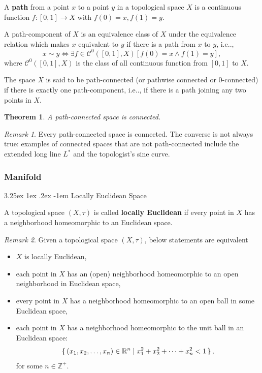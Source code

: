 \documentclass[12pt, letterpaper]{article}
\makeatletter
\newcommand{\inte}{\mathbb{Z}}
\newcommand{\re}{\mathbb{R}}
\newcommand\ie{i.e\@ifnextchar.{}{.\@}}
\newtheorem{thm}[prop]{Theorem}
\renewcommand\paragraph{\@startsection{paragraph}{4}{\z@}%
	{3.25ex \@plus1ex \@minus.2ex}%
	{-1em}%
	{\normalfont\normalsize\bfseries}}
\theoremstyle{definition}
\theoremstyle{remark}
\newtheorem*{rem*}{Remark}
\theoremstyle{definition}
\theoremstyle{plain}
\numberwithin{equation}{section}
\makeatother
\begin{document}
	\begin{def*}[path]
		A \textbf{path} from a point $x$ to a point $y$ in a topological space $X$ is a continuous function $f\colon [0,1] \to X$ with $f(0) = x, f(1) = y$.
	\end{def*}
	\begin{def*}
		A path-component of $X$ is an equivalence class of $X$ under the equivalence relation
		which makes $x$ equivalent to $y$ if there is a path from $x$ to $y$, \ie,
		\[ x\sim y \iff \exists f\in \mathcal{C}^0([0,1], X) [ f(0)=x \land  f(1)=y ] ,\]
		where $\mathcal{C}^0([0,1], X)$ is the class of all continuous function from $[0,1]$ to $X$.
	\end{def*}
	\begin{def*}
		The space $X$ is said to be path-connected (or pathwise connected or 0-connected)
		if there is exactly one path-component, \ie, if there is a path joining any two points in $X$.
	\end{def*}
	\begin{thm}
		A path-connected space is connected.
	\end{thm}
	\begin{rem*}
		Every path-connected space is connected. The converse is not always true: examples of connected spaces that are not path-connected include the extended long line $L^*$ and the topologist's sine curve.
	\end{rem*}
	
	\subsubsection{Manifold}
	\paragraph{Locally Euclidean Space}
	\begin{def*}
		A topological space $(X,\tau)$ is called \textbf{locally Euclidean}
		if every point in $X$ has a neighborhood homeomorphic to an Euclidean space.
	\end{def*}
	\begin{rem*}
		Given a topological space $(X,\tau)$, below statements are equivalent
		\begin{itemize}
			\item $X$ is locally Euclidean,
			\item each point in $X$ has an (open) neighborhood homeomorphic to an open neighborhood in Euclidean space,
			\item every point in $X$ has a neighborhood homeomorphic to an open ball in some Euclidean space,
			\item each point in $X$ has a neighborhood homeomorphic to the unit ball in an Euclidean space:
			\[ \set{(x_{1},x_{2},\dots ,x_{n})\in \mathbb {R} ^{n}\mid x_{1}^{2}+x_{2}^{2}+\cdots +x_{n}^{2}<1} ,\]
			for some $n\in\inte^+$.
		\end{itemize}		
	\end{rem*}
\end{document}
